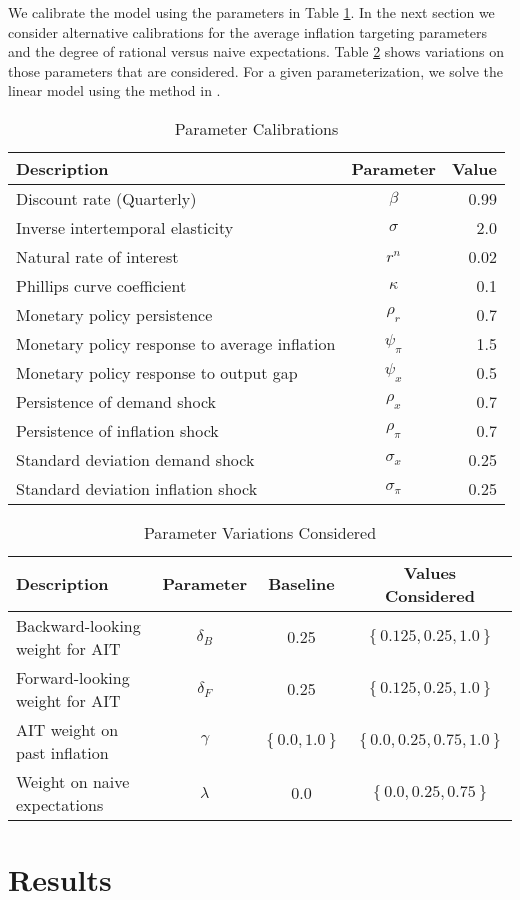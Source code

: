 \documentclass[english,authoryear,12pt]{elsarticle}
\begin{document}
We calibrate the model using the parameters in Table \ref{tb:parms}. In the next section we consider alternative calibrations for the average inflation targeting parameters and the degree of rational versus naive expectations. Table \ref{tb:parmsvary} shows variations on those parameters that are considered. For a given parameterization, we solve the linear model using the method in \cite{sims_solving_2002}.

\begin{table}[htp]
	\caption{Parameter Calibrations}\label{tb:parms}
	\begin{center}
		\begin{tabular}{lcr} \hline
			Description & Parameter & Value \\ \hline
			Discount rate (Quarterly) & $\beta$ & 0.99 \\
			Inverse intertemporal elasticity & $\sigma$ & 2.0 \\
			Natural rate of interest & $r^n$ & 0.02 \\
			Phillips curve coefficient & $\kappa$ & 0.1 \\
			Monetary policy persistence & $\rho_r$ & 0.7 \\
			Monetary policy response to average inflation & $\psi_\pi$ & 1.5 \\
			Monetary policy response to output gap & $\psi_x$ & 0.5 \\
			Persistence of demand shock & $\rho_x$ & 0.7 \\
			Persistence of inflation shock & $\rho_\pi$ & 0.7 \\
			Standard deviation demand shock & $\sigma_x$ & 0.25 \\
			Standard deviation inflation shock & $\sigma_\pi$ & 0.25 \\
			\hline
		\end{tabular}
	\end{center}
\end{table}

\begin{table}\caption{Parameter Variations Considered}\label{tb:parmsvary}
	\begin{center}
		\begin{tabular}{lccc}
			Description & Parameter & Baseline & Values Considered \\ \hline
			Backward-looking weight for AIT & $\delta_B$ & 0.25 & $\left\{0.125, 0.25, 1.0 \right\}$ \\  [0.25pc]
			Forward-looking weight for AIT & $\delta_F$ & 0.25 & $\left\{0.125, 0.25, 1.0 \right\}$ \\  [0.25pc]
			AIT weight on past inflation & $\gamma$ & $\left\{ 0.0, 1.0 \right\}$ & $\left\{ 0.0, 0.25, 0.75, 1.0\right\}$ \\  [0.25pc]
			Weight on naive expectations & $\lambda$ & 0.0 & $\left\{ 0.0, 0.25, 0.75 \right\}$ \\ [0.25pc]
			\hline
		\end{tabular}
	\end{center}
\end{table}

\section{Results}





\end{document}
